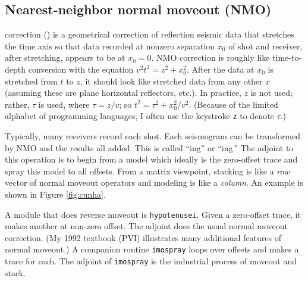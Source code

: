 

% 




\subsection{Nearest-neighbor normal moveout (NMO)}
\par
{}
correction () is a geometrical correction
of reflection seismic data
that stretches the time axis so that data recorded
at nonzero separation $x_0$ of shot and receiver,
after stretching, appears to be at $x_0=0$.
NMO correction is roughly like time-to-depth conversion
with the equation $v^2 t^2 = z^2 + x_0^2$.
After the data at $x_0$ is stretched from $t$ to $z$,
it should look like stretched data from any other $x$
(assuming these are plane horizontal reflectors, etc.).
In practice, $z$ is not used; rather,
 $\tau$ is used,
where $\tau =z/v$;
so $t^2 = \tau^2+x_0^2/v^2$.
(Because of the limited alphabet of programming languages,
I often use the keystroke {\tt z} to denote $\tau$.)


\par
Typically, many receivers record each shot.
Each seismogram can be transformed by NMO
and the results all added.
This is called ``ing'' or ``ing.''
The adjoint to this operation is to begin from
a model which ideally is the zero-offset trace
and spray this model to all offsets.
From a matrix viewpoint, stacking is like a {\em  row} vector
of normal moveout operators and modeling is like a {\em  column}.
An example is shown in Figure \ref{fig:cunha}.

\par
A module that does reverse moveout is \texttt{hypotenusei}.
Given a zero-offset trace, it makes another at non-zero offset.
The adjoint does the usual normal moveout correction.
(My 1992 textbook (PVI) illustrates many additional features of normal moveout.)
A companion routine \texttt{imospray}
loops over offsets and makes a trace for each.
The adjoint of {\tt imospray} is the industrial process of moveout and stack.

